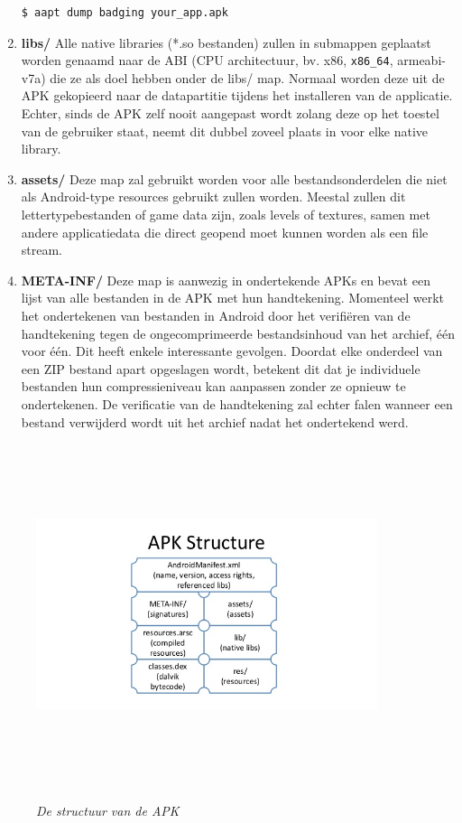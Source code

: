 \begin{enumerate}
\begin{lstlisting}[backgroundcolor = \color{lightgray}, xleftmargin = 2cm,
framexleftmargin = 1em]
$ aapt dump badging your_app.apk
\end{lstlisting}
\item \textbf{libs/}\newline
Alle native libraries (*.so bestanden) zullen in submappen geplaatst worden genaamd naar de ABI (CPU architectuur, bv. x86, \texttt{x86\_64}, armeabi-v7a) die ze als doel hebben onder de libs/ map. Normaal worden deze uit de APK gekopieerd naar de datapartitie tijdens het installeren van de applicatie. Echter, sinds de APK zelf nooit aangepast wordt zolang deze op het toestel van de gebruiker staat, neemt dit dubbel zoveel plaats in voor elke native library. 
\item \textbf{assets/}\newline
Deze map zal gebruikt worden voor alle bestandsonderdelen die niet als Android-type resources gebruikt zullen worden. Meestal zullen dit lettertypebestanden of game data zijn, zoals levels of textures, samen met andere applicatiedata die direct geopend moet kunnen worden als een file stream.
\item \textbf{META-INF/}\newline
Deze map is aanwezig in ondertekende APKs en bevat een lijst van alle bestanden in de APK met hun handtekening. Momenteel werkt het ondertekenen van bestanden in Android door het verifiëren van de handtekening tegen de ongecomprimeerde bestandsinhoud van het archief, één voor één. Dit heeft enkele interessante gevolgen. Doordat elke onderdeel van een ZIP bestand apart opgeslagen wordt, betekent dit dat je individuele bestanden hun compressieniveau kan aanpassen zonder ze opnieuw te ondertekenen. De verificatie van de handtekening zal echter falen wanneer een bestand verwijderd wordt uit het archief nadat het ondertekend werd. 
\end{enumerate}

\begin{figure}[H]
	\centering
	\caption{\textit{De structuur van de APK}}
	\includegraphics[width=10cm, height=10cm, keepaspectratio]{img/ApkStructure}\\[.5cm]
	
\end{figure}

